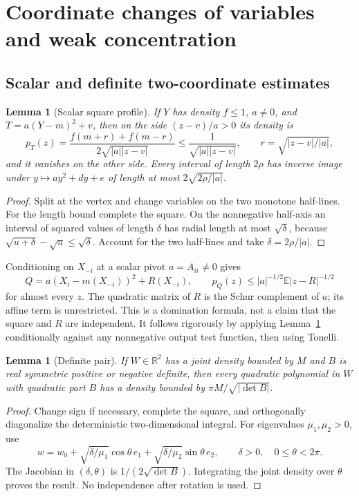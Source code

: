 \documentclass[11pt]{article}
\numberwithin{equation}{section}
\newtheorem{lemma}[theorem]{Lemma}
\theoremstyle{definition}\newtheorem{definition}[theorem]{Definition}
\theoremstyle{remark}\newtheorem{remark}[theorem]{Remark}
\newcommand{\R}{\mathbb R}\newcommand{\E}{\mathbb E}\newcommand{\PP}{\mathbb P}
\newcommand{\1}{\mathbf 1}\newcommand{\diag}{\operatorname{diag}}
\begin{document}
\section{Coordinate changes of variables and weak concentration}\label{sec:pivots}
\subsection{Scalar and definite two-coordinate estimates}
\begin{lemma}[Scalar square profile]\label{lem:square}
If $Y$ has density $f\le1$, $a\ne0$, and $T=a(Y-m)^2+v$, then on the side $(z-v)/a>0$ its density is
\[
 p_T(z)=\frac{f(m+r)+f(m-r)}{2\sqrt{|a||z-v|}}
 \le\frac1{\sqrt{|a||z-v|}},\qquad r=\sqrt{|z-v|/|a|},
\]
and it vanishes on the other side. Every interval of length $2\rho$ has inverse image under $y\mapsto ay^2+dy+e$ of length at most $2\sqrt{2\rho/|a|}$.
\end{lemma}
\begin{proof}
Split at the vertex and change variables on the two monotone half-lines. For the length bound complete the square. On the nonnegative half-axis an interval of squared values of length $\delta$ has radial length at most $\sqrt\delta$, because $\sqrt{u+\delta}-\sqrt u\le\sqrt\delta$. Account for the two half-lines and take $\delta=2\rho/|a|$.
\end{proof}

Conditioning on $X_{-i}$ at a scalar pivot $a=A_{ii}\ne0$ gives
\begin{equation}\label{eq:profile}
 Q=a(X_i-m(X_{-i}))^2+R(X_{-i}),\qquad
 p_Q(z)\le |a|^{-1/2}\E|z-R|^{-1/2}
\end{equation}
for almost every $z$. The quadratic matrix of $R$ is the Schur complement of $a$; its affine term is unrestricted. This is a domination formula, not a claim that the square and $R$ are independent. It follows rigorously by applying Lemma~\ref{lem:square} conditionally against any nonnegative output test function, then using Tonelli.

\begin{lemma}[Definite pair]\label{lem:definite}
If $W\in\R^2$ has a joint density bounded by $M$ and $B$ is real symmetric positive or negative definite, then every quadratic polynomial in $W$ with quadratic part $B$ has a density bounded by $\pi M/\sqrt{|\det B|}$.
\end{lemma}
\begin{proof}
Change sign if necessary, complete the square, and orthogonally diagonalize the deterministic two-dimensional integral. For eigenvalues $\mu_1,\mu_2>0$, use
\[
 w=w_0+\sqrt{\delta/\mu_1}\cos\theta\,e_1+
 \sqrt{\delta/\mu_2}\sin\theta\,e_2,
 \qquad \delta>0,\quad0\le\theta<2\pi.
\]
The Jacobian in $(\delta,\theta)$ is $1/(2\sqrt{\det B})$. Integrating the joint density over $\theta$ proves the result. No independence after rotation is used.
\end{proof}
\end{document}
